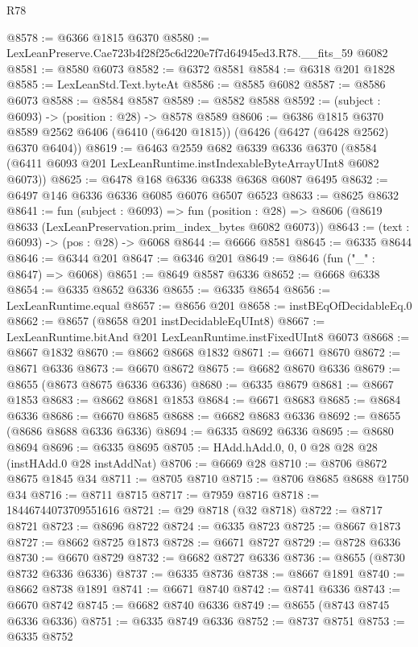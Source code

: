 \begin{lexlean}{R78}
\begin{coremodule}
@8578 := @6366 @1815 @6370
@8580 := LexLeanPreserve.Cae723b4f28f25c6d220e7f7d64945ed3.R78.__fits_59 @6082
@8581 := @8580 @6073
@8582 := @6372 @8581
@8584 := @6318 @201 @1828
@8585 := LexLeanStd.Text.byteAt
@8586 := @8585 @6082
@8587 := @8586 @6073
@8588 := @8584 @8587
@8589 := @8582 @8588
@8592 := (subject : @6093) -> (position : @28) -> @8578 @8589
@8606 := @6386
    @1815
    @6370
    @8589
    @2562
    @6406
    (@6410 (@6420 @1815))
    (@6426 (@6427 (@6428 @2562) @6370 @6404))
@8619 := @6463
    @2559
    @682
    @6339
    @6336
    @6370
    (@8584 (@6411 @6093 @201 LexLeanRuntime.instIndexableByteArrayUInt8 @6082 @6073))
@8625 := @6478 @168 @6336 @6338 @6368 @6087 @6495
@8632 := @6497 @146 @6336 @6336 @6085 @6076 @6507 @6523
@8633 := @8625 @8632
@8641 := fun (subject : @6093) =>
  fun (position : @28) => @8606 (@8619 @8633 (LexLeanPreservation.prim_index_bytes @6082 @6073))
@8643 := (text : @6093) -> (pos : @28) -> @6068
@8644 := @6666 @8581
@8645 := @6335 @8644
@8646 := @6344 @201
@8647 := @6346 @201
@8649 := @8646 (fun ("_" : @8647) => @6068)
@8651 := @8649 @8587 @6336
@8652 := @6668 @6338
@8654 := @6335 @8652 @6336
@8655 := @6335 @8654
@8656 := LexLeanRuntime.equal
@8657 := @8656 @201
@8658 := instBEqOfDecidableEq.{0}
@8662 := @8657 (@8658 @201 instDecidableEqUInt8)
@8667 := LexLeanRuntime.bitAnd @201 LexLeanRuntime.instFixedUInt8 @6073
@8668 := @8667 @1832
@8670 := @8662 @8668 @1832
@8671 := @6671 @8670
@8672 := @8671 @6336
@8673 := @6670 @8672
@8675 := @6682 @8670 @6336
@8679 := @8655 (@8673 @8675 @6336 @6336)
@8680 := @6335 @8679
@8681 := @8667 @1853
@8683 := @8662 @8681 @1853
@8684 := @6671 @8683
@8685 := @8684 @6336
@8686 := @6670 @8685
@8688 := @6682 @8683 @6336
@8692 := @8655 (@8686 @8688 @6336 @6336)
@8694 := @6335 @8692 @6336
@8695 := @8680 @8694
@8696 := @6335 @8695
@8705 := HAdd.hAdd.{0, 0, 0} @28 @28 @28 (instHAdd.{0} @28 instAddNat)
@8706 := @6669 @28
@8710 := @8706 @8672 @8675 @1845 @34
@8711 := @8705 @8710
@8715 := @8706 @8685 @8688 @1750 @34
@8716 := @8711 @8715
@8717 := @7959 @8716
@8718 := 18446744073709551616
@8721 := @29 @8718 (@32 @8718)
@8722 := @8717 @8721
@8723 := @8696 @8722
@8724 := @6335 @8723
@8725 := @8667 @1873
@8727 := @8662 @8725 @1873
@8728 := @6671 @8727
@8729 := @8728 @6336
@8730 := @6670 @8729
@8732 := @6682 @8727 @6336
@8736 := @8655 (@8730 @8732 @6336 @6336)
@8737 := @6335 @8736
@8738 := @8667 @1891
@8740 := @8662 @8738 @1891
@8741 := @6671 @8740
@8742 := @8741 @6336
@8743 := @6670 @8742
@8745 := @6682 @8740 @6336
@8749 := @8655 (@8743 @8745 @6336 @6336)
@8751 := @6335 @8749 @6336
@8752 := @8737 @8751
@8753 := @6335 @8752

\end{coremodule}
\end{lexlean}
